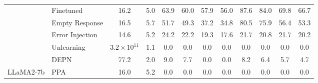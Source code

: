 \begin{table}[t]
{\begin{tabular}{ll|cc|cccccccc}
\multicolumn{1}{c|}{}                                                   & Finetuned                                                  & 16.2                                  & 5.0                                                         & 63.9              & 60.0              & 57.9              & 56.0              & 87.6              & 84.0               & 69.8                & 66.7                \\ \cline{2-12} 
\multicolumn{1}{c|}{}                                                   & Empty Response                                             & 16.5                                  & 5.7                                                         & 51.7              & 49.3              & 37.2              & 34.8              & 80.5              & 75.9               & 56.4                & 53.3                \\
\multicolumn{1}{c|}{}                                                   & Error Injection                                            & 14.6                                  & 5.2                                                         & 24.2              & 22.2              & 19.3              & 17.6              & 21.7              & 20.8               & 21.7                & 20.2                \\
\multicolumn{1}{c|}{}                                                   & Unlearning                                                 & $3.2\times10^{11}$                    & 1.1                                                         & 0.0               & 0.0               & 0.0               & 0.0               & 0.0               & 0.0                & 0.0                 & 0.0                 \\
\multicolumn{1}{c|}{}                                                   & DEPN                                                       & 77.2                                  & 2.0                                                         & 9.0               & 7.7               & 0.0               & 0.0               & 8.2               & 6.4                & 5.7                 & 4.7                 \\
\multicolumn{1}{c|}{\multirow{-7}{*}{LLaMA2-7b}}                        & \cellcolor[HTML]{EFEFEF}PPA                                & \cellcolor[HTML]{EFEFEF}16.0          & \cellcolor[HTML]{EFEFEF}5.2                                  & \cellcolor[HTML]{EFEFEF}0.0 & \cellcolor[HTML]{EFEFEF}0.0 & \cellcolor[HTML]{EFEFEF}0.0 & \cellcolor[HTML]{EFEFEF}0.0 & \cellcolor[HTML]{EFEFEF}0.0 & \cellcolor[HTML]{EFEFEF}0.0  & \cellcolor[HTML]{EFEFEF}0.0  & \cellcolor[HTML]{EFEFEF}0.0  \\ \hline

\end{tabular}}
\end{table}
